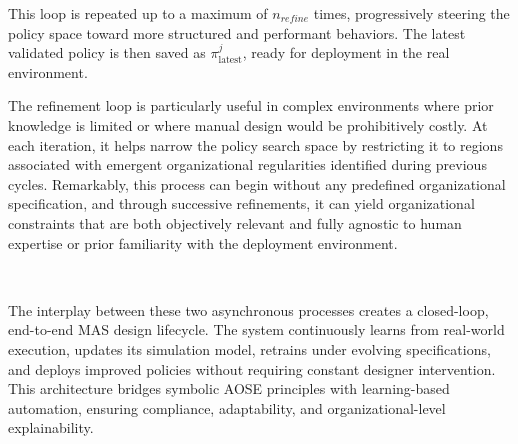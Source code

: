 \documentclass[pdflatex,sn-mathphys-num]{sn-jnl}%
\theoremstyle{thmstyleone}%
\theoremstyle{thmstyletwo}%
\theoremstyle{thmstylethree}%
\begin{document}
This loop is repeated up to a maximum of $n_{refine}$ times, progressively steering the policy space toward more structured and performant behaviors. The latest validated policy is then saved as $\pi^j_{\text{latest}}$, ready for deployment in the real environment.

The refinement loop is particularly useful in complex environments where prior knowledge is limited or where manual design would be prohibitively costly. At each iteration, it helps narrow the policy search space by restricting it to regions associated with emergent organizational regularities identified during previous cycles. Remarkably, this process can begin without any predefined organizational specification, and through successive refinements, it can yield organizational constraints that are both objectively relevant and fully agnostic to human expertise or prior familiarity with the deployment environment.

\

\noindent The interplay between these two asynchronous processes creates a closed-loop, end-to-end MAS design lifecycle. The system continuously learns from real-world execution, updates its simulation model, retrains under evolving specifications, and deploys improved policies without requiring constant designer intervention. This architecture bridges symbolic AOSE principles with learning-based automation, ensuring compliance, adaptability, and organizational-level explainability.
\end{document}
